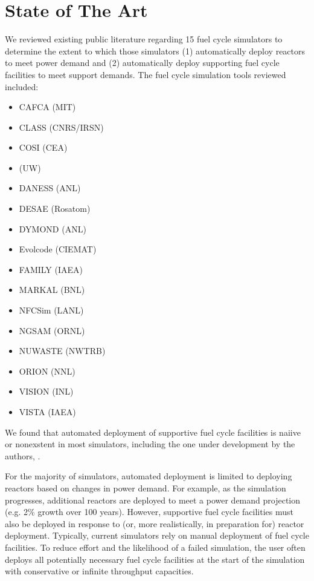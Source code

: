 \section{State of The Art}
We reviewed existing public literature regarding 15 fuel cycle simulators to 
determine the extent to which those simulators (1) automatically deploy reactors to 
meet power demand and (2) automatically deploy supporting fuel cycle facilities 
to meet support demands. The fuel cycle simulation tools reviewed included:

\begin{itemize}
        \item CAFCA (MIT) \cite{guerin_impact_2009}
        \item CLASS (CNRS/IRSN) \cite{mouginot_class_2012}
        \item COSI (CEA) \cite{coquelet-pascal_cosi6:_2015,boucher_international_2010}
        \item \Cyclus (UW) \cite{huff_fundamental_2014} %
        \item DANESS (ANL) \cite{van_den_durpel_daness:_2006} %
        \item DESAE (Rosatom) \cite{boucher_international_2010}
        \item DYMOND (ANL) \cite{boucher_international_2010}
        \item Evolcode (CIEMAT) \cite{boucher_international_2010}
        \item FAMILY (IAEA) \cite{boucher_international_2010}
        \item MARKAL (BNL) \cite{feng_standardized_2016}
        \item NFCSim (LANL) \cite{schneider_nfcsim:_2005}
        \item NGSAM (ORNL) \cite{aubin_development_2013}
        \item NUWASTE (NWTRB) \cite{garrick_nuclear_2011}
        \item ORION (NNL) \cite{feng_standardized_2016}
        \item VISION (INL) \cite{feng_standardized_2016,boucher_international_2010}
        \item VISTA (IAEA) \cite{iaea_nuclear_2007}
\end{itemize}

We found that automated deployment of supportive fuel cycle facilities is naiive or 
nonexstent in most simulators, including the one under development by the 
authors, \Cyclus.

For the majority of simulators, automated deployment is limited to deploying 
reactors based on changes in power demand. 
For example, as the simulation 
progresses, additional reactors are deployed to meet a power demand projection 
(e.g. 2\% growth over 100 years). 
However, supportive fuel cycle facilities must also be deployed in response to 
(or, more realistically, in preparation for) reactor deployment.  
Typically, current simulators rely on manual deployment of fuel cycle 
facilities. To reduce effort and the likelihood of a failed simulation, the 
user often deploys all potentially necessary fuel cycle facilities at the start 
of the simulation with conservative or infinite throughput capacities. 

